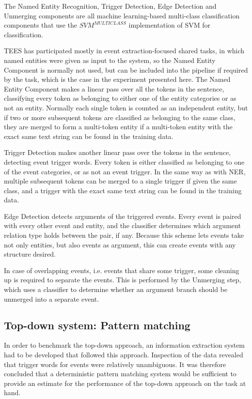The Named Entity Recognition, Trigger Detection, Edge Detection and Unmerging components are all machine learning-based multi-class classification components that use the $SVM^{MULTICLASS}$ implementation of SVM for classification.

TEES has participated mostly in event extraction-focused shared tasks, in which named entities were given as input to the system, so the Named Entity Component is normally not used, but can be included into the pipeline if required by the task, which is the case in the experiment presented here. The Named Entity Component makes a linear pass over all the tokens in the sentence, classifying every token as belonging to either one of the entity categories or as not an entity. Normally each single token is counted as an independent entity, but if two or more subsequent tokens are classified as belonging to the same class, they are merged to form a multi-token entity if a multi-token entity with the exact same text string can be found in the training data.

Trigger Detection makes another linear pass over the tokens in the sentence, detecting event trigger words. Every token is either classified as belonging to one of the event categories, or as not an event trigger. In the same way as with NER, multiple subsequent tokens can be merged to a single trigger if given the same class, and a trigger with the exact same text string can be found in the training data.

Edge Detection detects arguments of the triggered events. Every event is paired with every other event and entity, and the classifier determines which argument relation type holds between the pair, if any. Because this scheme lets events take not only entities, but also events as argument, this can create events with any structure desired.

In case of overlapping events, i.e. events that share some trigger, some cleaning up is required to separate the events. This is performed by the Unmerging step, which uses a classifier to determine whether an argument branch should be unmerged into a separate event. 

\subsection{Top-down system: Pattern matching}

In order to benchmark the top-down approach, an information extraction system had to be developed that followed this approach. Inspection of the data revealed that trigger words for events were relatively unambiguous. It was therefore concluded that a deterministic pattern matching system would be sufficient to provide an estimate for the performance of the top-down approach on the task at hand.

